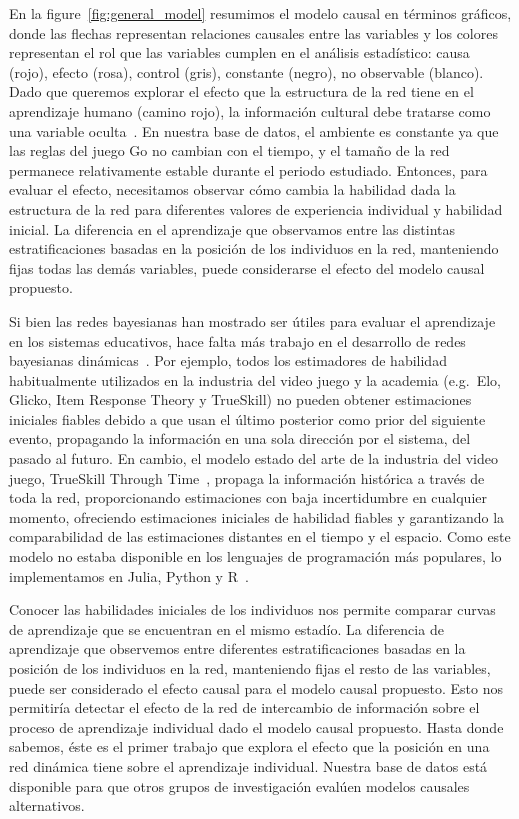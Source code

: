 \documentclass[a4paper,11pt]{book}
\theoremstyle{definition}
\begin{document}
En la figure~\ref{fig:general_model} resumimos el modelo causal en t\'erminos gr\'aficos, donde las flechas representan relaciones causales entre las variables y los colores representan el rol que las variables cumplen en el an\'alisis estad\'istico: causa (rojo), efecto (rosa), control (gris), constante (negro), no observable (blanco).
%
Dado que queremos explorar el efecto que la estructura de la red tiene en el aprendizaje humano (camino rojo), la informaci\'on cultural debe tratarse como una variable oculta~\cite{pearl2009-causality}.
%
En nuestra base de datos, el ambiente es constante ya que las reglas del juego Go no cambian con el tiempo, y el tama\~no de la red permanece relativamente estable durante el periodo estudiado.
%
Entonces, para evaluar el efecto, necesitamos observar c\'omo cambia la habilidad dada la estructura de la red para diferentes valores de experiencia individual y habilidad inicial.
%
La diferencia en el aprendizaje que observamos entre las distintas estratificaciones basadas en la posici\'on de los individuos en la red, manteniendo fijas todas las dem\'as variables, puede considerarse el efecto del modelo causal propuesto.


Si bien las redes bayesianas han mostrado ser \'utiles para evaluar el aprendizaje en los sistemas educativos, hace falta m\'as trabajo en el desarrollo de redes bayesianas din\'amicas~\cite{Almond2015}.
%
Por ejemplo, todos los estimadores de habilidad habitualmente utilizados en la industria del video juego y la academia (e.g.~Elo, Glicko, Item Response Theory y TrueSkill) no pueden obtener estimaciones iniciales fiables debido a que usan el \'ultimo posterior como prior del siguiente evento, propagando la informaci\'on en una sola direcci\'on por el sistema, del pasado al futuro.
%
En cambio, el modelo estado del arte de la industria del video juego, TrueSkill Through Time~\cite{Landfried2021-TTT, Dangauthier2007}, propaga la informaci\'on hist\'orica a trav\'es de toda la red, proporcionando estimaciones con baja incertidumbre en cualquier momento, ofreciendo estimaciones iniciales de habilidad fiables y garantizando la comparabilidad de las estimaciones distantes en el tiempo y el espacio.
%
Como este modelo no estaba disponible en los lenguajes de programaci\'on m\'as populares, lo implementamos en Julia, Python y R~\cite{Landfried2021-TTT}.


Conocer las habilidades iniciales de los individuos nos permite comparar curvas de aprendizaje que se encuentran en el mismo estad\'io.
%
La diferencia de aprendizaje que observemos entre diferentes estratificaciones basadas en la posici\'on de los individuos en la red, manteniendo fijas el resto de las variables, puede ser considerado el efecto causal para el modelo causal propuesto.
%
Esto nos permitir\'ia detectar el efecto de la red de intercambio de informaci\'on sobre el proceso de aprendizaje individual dado el modelo causal propuesto.
%
Hasta donde sabemos, \'este es el primer trabajo que explora el efecto que la posici\'on en una red din\'amica tiene sobre el aprendizaje individual.
%
Nuestra base de datos est\'a disponible para que otros grupos de investigaci\'on eval\'uen modelos causales alternativos.
\end{document}
